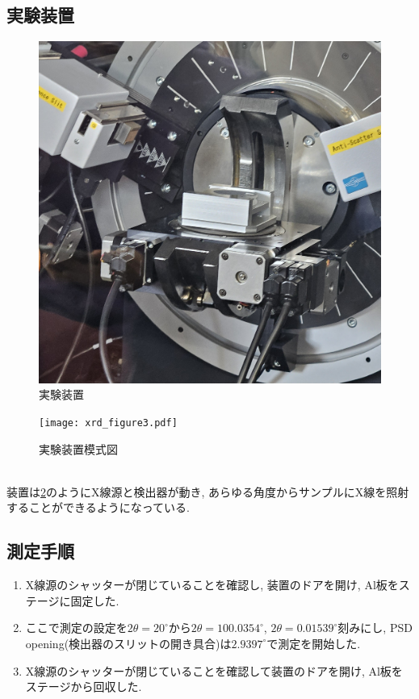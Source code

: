 \documentclass[11pt]{ltjsarticle}
\begin{document}
    \subsection*{実験装置}
    \begin{minipage}[b]{0.45\textwidth}
      \begin{figure}[H]
        \centering
        \includegraphics[width=0.97\columnwidth]{jikkenkigu.jpg}
        \caption{実験装置}
        \label{fig:jikkenkigu}
      \end{figure}
    \end{minipage}
    \hfill
    \begin{minipage}[b]{0.45\textwidth}
      \vfill
      \begin{figure}[H]
        \centering
        \texttt{[image: xrd\_figure3.pdf]}
        \caption{実験装置模式図}
        \label{fig:moshiki}
      \end{figure}
    \end{minipage}
    \\
    装置は\cref{fig:moshiki}のようにX線源と検出器が動き, あらゆる角度からサンプルにX線を照射することができるようになっている.
    \subsection*{測定手順}
      \begin{enumerate}
        \item X線源のシャッターが閉じていることを確認し, 装置のドアを開け, Al板をステージに固定した. 
        \item ここで測定の設定を$2\theta =20^{\circ}$から$2\theta =100.0354^{\circ}$, $2\theta=0.01539^\circ$刻みにし, PSD opening(検出器のスリットの開き具合)は$2.9397^\circ$で測定を開始した.
        \item X線源のシャッターが閉じていることを確認して装置のドアを開け, Al板をステージから回収した. 
      \end{enumerate}
\end{document}
